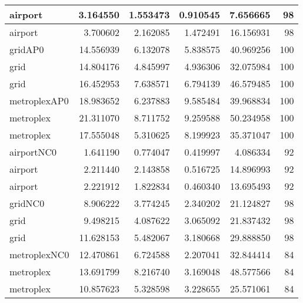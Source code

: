 \begin{longtable}{|l|r|r|r|r|r|}
airport & 3.164550 & 1.553473 & 0.910545 & 7.656665 & 98 \\ \hline
airport & 3.700602 & 2.162085 & 1.472491 & 16.156931 & 98 \\ \hline
gridAP0 & 14.556939 & 6.132078 & 5.838575 & 40.969256 & 100 \\ \hline
grid & 14.804176 & 4.845997 & 4.936306 & 32.075984 & 100 \\ \hline
grid & 16.452953 & 7.638571 & 6.794139 & 46.579485 & 100 \\ \hline
metroplexAP0 & 18.983652 & 6.237883 & 9.585484 & 39.968834 & 100 \\ \hline
metroplex & 21.311070 & 8.711752 & 9.259588 & 50.234958 & 100 \\ \hline
metroplex & 17.555048 & 5.310625 & 8.199923 & 35.371047 & 100 \\ \hline
airportNC0 & 1.641190 & 0.774047 & 0.419997 & 4.086334 & 92 \\ \hline
airport & 2.211440 & 2.143858 & 0.516725 & 14.896993 & 92 \\ \hline
airport & 2.221912 & 1.822834 & 0.460340 & 13.695493 & 92 \\ \hline
gridNC0 & 8.906222 & 3.774245 & 2.340202 & 21.124827 & 98 \\ \hline
grid & 9.498215 & 4.087622 & 3.065092 & 21.837432 & 98 \\ \hline
grid & 11.628153 & 5.482067 & 3.180668 & 29.888850 & 98 \\ \hline
metroplexNC0 & 12.470861 & 6.724588 & 2.207041 & 32.844414 & 84 \\ \hline
metroplex & 13.691799 & 8.216740 & 3.169048 & 48.577566 & 84 \\ \hline
metroplex & 10.857623 & 5.328598 & 3.228655 & 25.571061 & 84 \\ \hline
\end{longtable}
